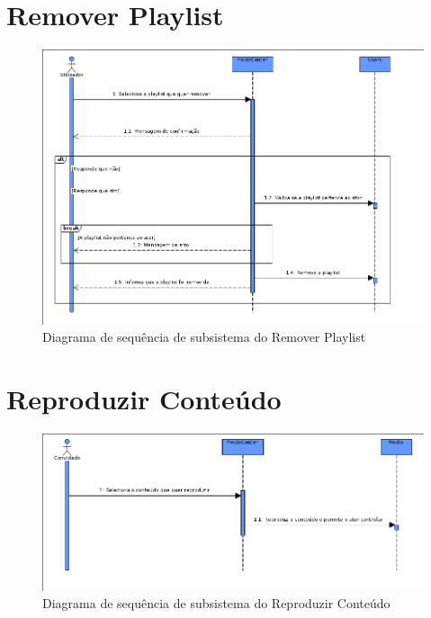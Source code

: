 \documentclass[a4paper]{report}
\begin{document}
\section{Remover Playlist}
\begin{figure}[H]
	\centering 
    \includegraphics[width=\textwidth]{images/remplaylistSub.png}  
    \caption{Diagrama de sequência de subsistema do Remover Playlist}
\end{figure}

\section{Reproduzir Conteúdo}
\begin{figure}[H]
	\centering 
    \includegraphics[width=\textwidth]{images/repconteudoSub.png}  
    \caption{Diagrama de sequência de subsistema do Reproduzir Conteúdo}
\end{figure}
\end{document}
